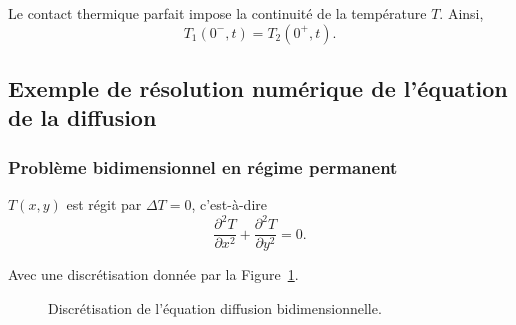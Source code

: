         Le contact thermique parfait impose la continuité de la température $T$. Ainsi,
        \begin{equation*}
            \boxed{
                T_1(0^{-},t)=T_{2}(0^{+},t).
            }
        \end{equation*}

    \subsection{Exemple de résolution numérique de l'équation de la diffusion}
        \subsubsection{Problème bidimensionnel en régime permanent}
            $T(x,y)$ est régit par $\Delta T=0$, c'est-à-dire
            \begin{equation*}
                \frac{\partial^{2}T}{\partial x^{2}}+\frac{\partial^{2}T}{\partial y^{2}}=0.
            \end{equation*}

            Avec une discrétisation donnée par la Figure~\ref{fig:discretisation_equation_diffusion_bidimensionnelle}.

            \begin{figure}
                \centering
                \caption{Discrétisation de l'équation diffusion bidimensionnelle.}    
                \label{fig:discretisation_equation_diffusion_bidimensionnelle}
            \end{figure}


